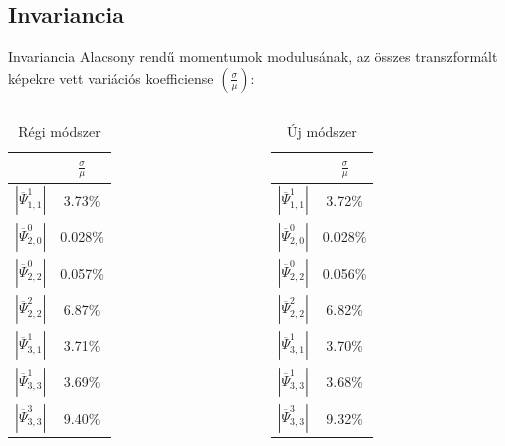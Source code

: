 \documentclass{beamer}
\begin{document}
\subsection{Invariancia}
\begin{frame}{Invariancia}
    \vskip 10mm
Alacsony rendű momentumok modulusának, az összes transzformált képekre vett variációs koefficiense $\left(\frac{\sigma}{\mu}\right)$:
\begin{columns}
    \begin{column}{.5\textwidth}
        \begin{table}
            \centering
        \begin{tabular}{| c | c | } \hline
        & $\frac{\sigma}{\mu}$ \\ \hline\hline
        $|\overline{\Psi}_{1,1}^1|$ & 3.73\% \\ \hline
        $|\overline{\Psi}_{2,0}^0|$ & 0.028\% \\ \hline
        $|\overline{\Psi}_{2,2}^0|$ & 0.057\% \\ \hline
        $|\overline{\Psi}_{2,2}^2|$ & 6.87\% \\ \hline
        $|\overline{\Psi}_{3,1}^1|$ & 3.71\%  \\ \hline
        $|\overline{\Psi}_{3,3}^1|$ & 3.69\% \\ \hline
        $|\overline{\Psi}_{3,3}^3|$ & 9.40\% \\ \hline
        \end{tabular}
        \caption{Régi módszer}
        \end{table}
    \end{column}
    \begin{column}{.5\textwidth}
        \begin{table}
            \centering
        \begin{tabular}{| c | c | } \hline
        & $\frac{\sigma}{\mu}$ \\ \hline\hline
        $|\overline{\Psi}_{1,1}^1|$ & 3.72\% \\ \hline
        $|\overline{\Psi}_{2,0}^0|$ & 0.028\%\\ \hline
        $|\overline{\Psi}_{2,2}^0|$ & 0.056\%\\ \hline
        $|\overline{\Psi}_{2,2}^2|$ & 6.82\%\\ \hline
        $|\overline{\Psi}_{3,1}^1|$ & 3.70\%\\ \hline
        $|\overline{\Psi}_{3,3}^1|$ & 3.68\%\\ \hline
        $|\overline{\Psi}_{3,3}^3|$ & 9.32\%\\ \hline
        \end{tabular}
        \caption{Új módszer}
        \end{table}
    \end{column}
\end{columns}
\end{frame}
\end{document}
